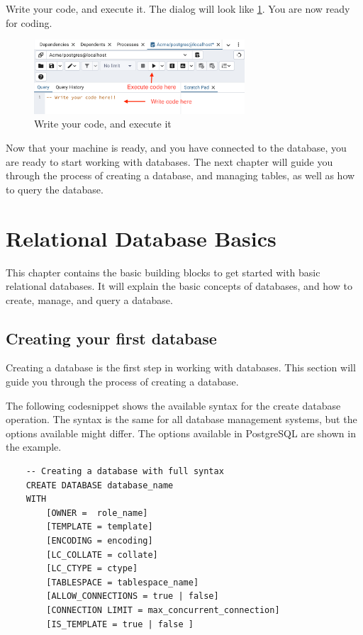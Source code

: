 Write your code, and execute it. The dialog will look like \cref{fig:1.pgadmin9}. You are now ready for coding.

\begin{figure}[H]
    \centering
    \includegraphics[width=0.7\textwidth]{content/1-relational-databases/figures/pgadmin/9.png}
    \caption{Write your code, and execute it}
    \label{fig:1.pgadmin9}
\end{figure}

Now that your machine is ready, and you have connected to the database, you are ready to start working with databases. The next chapter will guide you through the process of creating a database, and managing tables, as well as how to query the database.


\chapter{Relational Database Basics}
\label{chap:relational:relational-database-basics}
This chapter contains the basic building blocks to get started with basic relational databases.
It will explain the basic concepts of databases, and how to create, manage, and query a database.

\section{Creating your first database}
Creating a database is the first step in working with databases. This section will guide you through the process of creating a database. 

The following codesnippet shows the available syntax for the create database operation. The syntax is the same for all database management systems, but the options available might differ. The options available in PostgreSQL are shown in the example.

\begin{verbatim}
    -- Creating a database with full syntax
    CREATE DATABASE database_name
    WITH
        [OWNER =  role_name]
        [TEMPLATE = template]
        [ENCODING = encoding]
        [LC_COLLATE = collate]
        [LC_CTYPE = ctype]
        [TABLESPACE = tablespace_name]
        [ALLOW_CONNECTIONS = true | false]
        [CONNECTION LIMIT = max_concurrent_connection]
        [IS_TEMPLATE = true | false ]
\end{verbatim}

